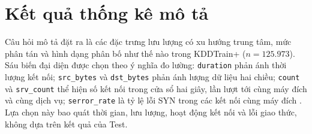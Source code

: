 \section{Kết quả thống kê mô tả}
Câu hỏi mô tả đặt ra là các đặc trưng lưu lượng có xu hướng trung tâm, mức phân tán và hình dạng phân bố như thế nào trong KDDTrain+ ($n=125.973$). Sáu biến đại diện được chọn theo ý nghĩa đo lường: \texttt{duration} phản ánh thời lượng kết nối; \texttt{src\_bytes} và \texttt{dst\_bytes} phản ánh lượng dữ liệu hai chiều; \texttt{count} và \texttt{srv\_count} thể hiện số kết nối trong cửa sổ hai giây, lần lượt tới cùng máy đích và cùng dịch vụ; \texttt{serror\_rate} là tỷ lệ lỗi SYN trong các kết nối cùng máy đích \cite{task2_kdd1999}. Lựa chọn này bao quát thời gian, lưu lượng, hoạt động kết nối và lỗi giao thức, không dựa trên kết quả của Test.

